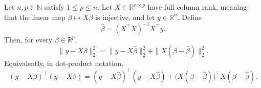 \begin{theorem}
Let $n,p\in\mathbb N$ satisfy $1\le p\le n$.  Let
$X\in\mathbb R^{n\times p}$ have full column rank, meaning that the linear
map $\beta\mapsto X\beta$ is injective, and let $y\in\mathbb R^n$.  Define
\[
  \widehat\beta=(X^\top X)^{-1}X^\top y.
\]
Then, for every $\beta\in\mathbb R^p$,
\[
  \|y-X\beta\|_2^2
  =\|y-X\widehat\beta\|_2^2
   +\|X(\beta-\widehat\beta)\|_2^2.
\]
Equivalently, in dot-product notation,
\[
  (y-X\beta)^\top(y-X\beta)
  =(y-X\widehat\beta)^\top(y-X\widehat\beta)
   +\bigl(X(\beta-\widehat\beta)\bigr)^\top
    X(\beta-\widehat\beta).
\]
\end{theorem}
